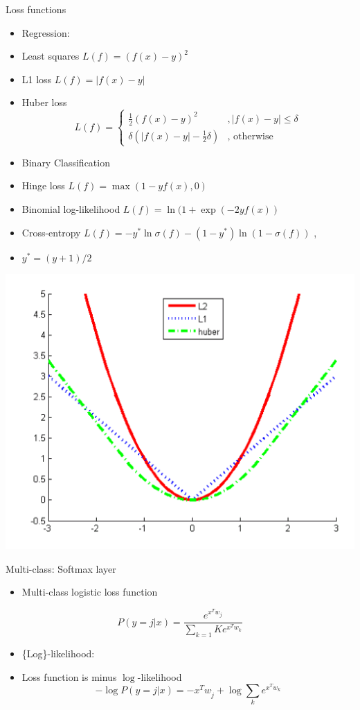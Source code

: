 \documentclass[12pt,notes,mathserif]{beamer}
\providecommand{\tightlist}{%
	\setlength{\itemsep}{0pt}\setlength{\parskip}{0pt}}
\begin{document}
\begin{frame}{Loss functions}

\begin{itemize}
\tightlist
\item
  Regression:
\item
  Least squares \(L(f)=(f(x)-y)^{2}\)
\item
  L1 loss \(L(f)=|f(x)-y|\)
\item
  Huber loss
  \[L({f})=\begin{cases} \frac{1}{2} (f(x)-y)^2 & , |f(x)-y| \le \delta \\ \delta (|f(x)-y| -\frac{1}{2} \delta ) & \textrm{, otherwise} \end{cases}\]
\item
  Binary Classification
\item
  Hinge loss \(L(f)=\max(1-yf(x), 0)\)
\item
  Binomial log-likelihood \(L(f)=\ln(1+\exp(-2yf(x))\)
\item
  Cross-entropy \(L(f)=-y^{*}\ln \sigma(f)-(1-y^{*})\ln(1- \sigma(f))\)
  ,
\item
  \(y^{*}=(y+1)/2\)
\end{itemize}

\begin{center}
    \includegraphics[width=.2\textwidth]{2018-04-15-13-10-18.png}
\end{center}

\end{frame}

\begin{frame}{Multi-class: Softmax layer}

\begin{itemize}
\tightlist
\item
  Multi-class logistic loss function
\end{itemize}

\[P(y=j|x)=\frac{e^{x^Tw_j}}{\sum_{k=1}{K}e^{x^Tw_k}}\]

\begin{itemize}
\tightlist
\item
  \{\rm Log\}-likelihood:
\item
  Loss function is minus \(\log\)-likelihood \[
  -\log P(y=j|x)=-x^{T}w_{\dot{j}}+\log\sum_{k}e^{x^{T}w_{k}}
  \]
\end{itemize}

\end{frame}
\end{document}
